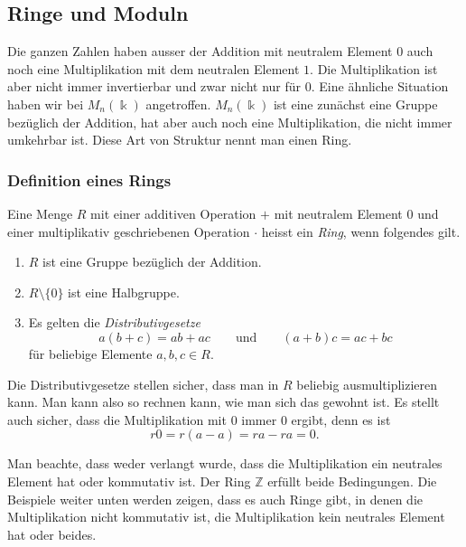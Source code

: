 %
%
%
\subsection{Ringe und Moduln
\label{buch:grundlagen:subsection:ringe}}
Die ganzen Zahlen haben ausser der Addition mit neutralem Element $0$
auch noch eine Multiplikation mit dem neutralen Element $1$.
Die Multiplikation ist aber nicht immer invertierbar und zwar
nicht nur für $0$.
Eine ähnliche Situation haben wir bei $M_n(\Bbbk)$ angetroffen.
$M_n(\Bbbk)$ ist eine zunächst eine Gruppe bezüglich der Addition,
hat aber auch noch eine Multiplikation, die nicht immer umkehrbar ist.
Diese Art von Struktur nennt man einen Ring.

\subsubsection{Definition eines Rings}

\begin{definition}
%
Eine Menge $R$ mit einer additiven Operation $+$ mit neutralem Element
$0$ und einer multiplikativ geschriebenen Operation $\cdot$ heisst ein
{\em Ring}, wenn folgendes gilt.
\begin{enumerate}
\item
$R$ ist eine Gruppe bezüglich der Addition.
\item
$R\setminus\{0\}$ ist eine Halbgruppe.
\item
Es gelten die {\em Distributivgesetze}
\[
a(b+c)=ab+ac
\qquad\text{und}\qquad
(a+b)c=ac+bc
\]
für beliebige Elemente $a,b,c\in R$.
%
\end{enumerate}
\end{definition}

Die Distributivgesetze stellen sicher, dass man in $R$ beliebig
ausmultiplizieren kann.
Man kann also so rechnen kann, wie man sich das gewohnt ist.
Es stellt auch sicher, dass die Multiplikation mit $0$ immer $0$
ergibt, denn es ist
\[
r0 = r(a-a) = ra-ra=0.
\]

Man beachte, dass weder verlangt wurde, dass die Multiplikation
ein neutrales Element hat oder kommutativ ist.
Der Ring $\mathbb{Z}$ erfüllt beide Bedingungen.
Die Beispiele weiter unten werden zeigen, dass es auch Ringe gibt,
in denen die Multiplikation nicht kommutativ ist, die Multiplikation
kein neutrales Element hat oder beides.

